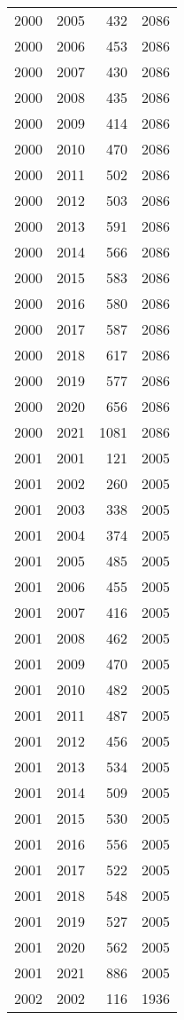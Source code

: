 \documentclass[
  11pt,
  letterpaper,
  DIV=11,
  numbers=noendperiod,
  twoside]{scrartcl}
\begin{document}
\begin{longtable}[]{@{}rrrr@{}}
2000 & 2005 & 432 & 2086 \\
2000 & 2006 & 453 & 2086 \\
2000 & 2007 & 430 & 2086 \\
2000 & 2008 & 435 & 2086 \\
2000 & 2009 & 414 & 2086 \\
2000 & 2010 & 470 & 2086 \\
2000 & 2011 & 502 & 2086 \\
2000 & 2012 & 503 & 2086 \\
2000 & 2013 & 591 & 2086 \\
2000 & 2014 & 566 & 2086 \\
2000 & 2015 & 583 & 2086 \\
2000 & 2016 & 580 & 2086 \\
2000 & 2017 & 587 & 2086 \\
2000 & 2018 & 617 & 2086 \\
2000 & 2019 & 577 & 2086 \\
2000 & 2020 & 656 & 2086 \\
2000 & 2021 & 1081 & 2086 \\
2001 & 2001 & 121 & 2005 \\
2001 & 2002 & 260 & 2005 \\
2001 & 2003 & 338 & 2005 \\
2001 & 2004 & 374 & 2005 \\
2001 & 2005 & 485 & 2005 \\
2001 & 2006 & 455 & 2005 \\
2001 & 2007 & 416 & 2005 \\
2001 & 2008 & 462 & 2005 \\
2001 & 2009 & 470 & 2005 \\
2001 & 2010 & 482 & 2005 \\
2001 & 2011 & 487 & 2005 \\
2001 & 2012 & 456 & 2005 \\
2001 & 2013 & 534 & 2005 \\
2001 & 2014 & 509 & 2005 \\
2001 & 2015 & 530 & 2005 \\
2001 & 2016 & 556 & 2005 \\
2001 & 2017 & 522 & 2005 \\
2001 & 2018 & 548 & 2005 \\
2001 & 2019 & 527 & 2005 \\
2001 & 2020 & 562 & 2005 \\
2001 & 2021 & 886 & 2005 \\
2002 & 2002 & 116 & 1936 \\

\end{longtable}
\end{document}
